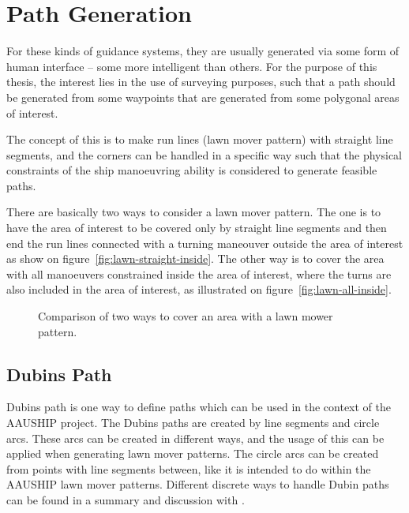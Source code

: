 \chapter{Path Generation}
\label{ch:pathgen}

For these kinds of guidance systems, they are usually generated via some
form of human interface -- some more intelligent than others. For the
purpose of this thesis, the interest lies in the use of surveying
purposes, such that a path should be generated from some waypoints
that are generated from some polygonal areas of interest.

The concept of this is to make run lines (lawn mover pattern) with
straight line segments, and the corners can be handled in a specific
way such that the physical constraints of the ship manoeuvring ability
is considered to generate feasible paths.

There are basically two ways to consider a lawn mover pattern. The
one is to have the area of interest to be covered only by straight line
segments and then end the run lines connected with a turning maneouver outside the
area of interest as show on figure~\vref{fig:lawn-straight-inside}. The other way is to cover the area with all manoeuvers constrained inside the area of interest, where the turns are also included in the area of interest, as illustrated on figure~\vref{fig:lawn-all-inside}.

\begin{figure}[htbp]
	\centering
	\qquad
	\caption{Comparison of two ways to cover an area with a lawn mower
	pattern.}
\end{figure}

\section{Dubins Path}
Dubins path is one way to define paths which can be used in the context of the AAUSHIP project. The Dubins paths are created by line segments and circle arcs. These arcs can be created in different ways, and the usage of this can be applied when generating lawn mover patterns. The circle arcs can be created from points with line segments between, like it is intended to do within the AAUSHIP lawn mover patterns. Different discrete ways to handle Dubin paths can be found in a summary and discussion with \citep{dubin}.


